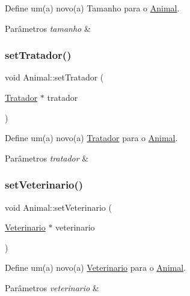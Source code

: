 Define um(a) novo(a) Tamanho para o \hyperlink{classAnimal}{Animal}. 


\begin{DoxyParams}{Parâmetros}
{\em tamanho} & \\
\hline
\end{DoxyParams}
\mbox{\label{classAnimal_aec8cd2eec7a0c833074e303f389c8f9f}} 
\subsubsection{\texorpdfstring{set\+Tratador()}{setTratador()}}
{\footnotesize\ttfamily void Animal\+::set\+Tratador (\begin{DoxyParamCaption}\item[{\hyperlink{classTratador}{Tratador} $\ast$}]{tratador }\end{DoxyParamCaption})}



Define um(a) novo(a) \hyperlink{classTratador}{Tratador} para o \hyperlink{classAnimal}{Animal}. 


\begin{DoxyParams}{Parâmetros}
{\em tratador} & \\
\hline
\end{DoxyParams}
\mbox{\label{classAnimal_ace9b58ea47057261292ce42a4edd2870}} 
\subsubsection{\texorpdfstring{set\+Veterinario()}{setVeterinario()}}
{\footnotesize\ttfamily void Animal\+::set\+Veterinario (\begin{DoxyParamCaption}\item[{\hyperlink{classVeterinario}{Veterinario} $\ast$}]{veterinario }\end{DoxyParamCaption})}



Define um(a) novo(a) \hyperlink{classVeterinario}{Veterinario} para o \hyperlink{classAnimal}{Animal}. 


\begin{DoxyParams}{Parâmetros}
{\em veterinario} & \\
\hline
\end{DoxyParams}
\mbox{\label{classAnimal_a2b9de87e4f753fc9f92aeb012bf098c5}} 
